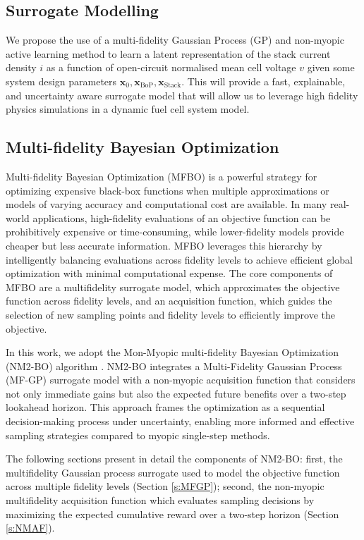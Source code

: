 \subsection{Surrogate Modelling}
We propose the use of a multi-fidelity Gaussian Process (GP) and non-myopic active learning method to learn a latent representation of the stack current density $i$ as a function of open-circuit normalised mean cell voltage $v$ given some system design parameters $\bm{x}_0, \bm{x}_{\text{BoP}}, \bm{x}_{\text{Stack}}$. This will provide a fast, explainable, and uncertainty aware surrogate model that will allow us to leverage high fidelity physics simulations in a dynamic fuel cell system model.

\subsection{Multi-fidelity Bayesian Optimization}

Multi-fidelity Bayesian Optimization (MFBO) is a powerful strategy for optimizing expensive black-box functions when multiple approximations or models of varying accuracy and computational cost are available. In many real-world applications, high-fidelity evaluations of an objective function can be prohibitively expensive or time-consuming, while lower-fidelity models provide cheaper but less accurate information. MFBO leverages this hierarchy by intelligently balancing evaluations across fidelity levels to achieve efficient global optimization with minimal computational expense. The core components of MFBO are a multifidelity surrogate model, which approximates the objective function across fidelity levels, and an acquisition function, which guides the selection of new sampling points and fidelity levels to efficiently improve the objective.

In this work, we adopt the Mon-Myopic multi-fidelity Bayesian Optimization (NM2-BO) algorithm \cite{DiFioreMaininiNM2BO}. NM2-BO integrates a Multi-Fidelity Gaussian Process (MF-GP) surrogate model with a non-myopic acquisition function that considers not only immediate gains but also the expected future benefits over a two-step lookahead horizon. This approach frames the optimization as a sequential decision-making process under uncertainty, enabling more informed and effective sampling strategies compared to myopic single-step methods.

The following sections present in detail the components of NM2-BO: first, the multifidelity Gaussian process surrogate used to model the objective function across multiple fidelity levels (Section \ref{s:MFGP}); second, the non-myopic multifidelity acquisition function which evaluates sampling decisions by maximizing the expected cumulative reward over a two-step horizon (Section \ref{s:NMAF}).

